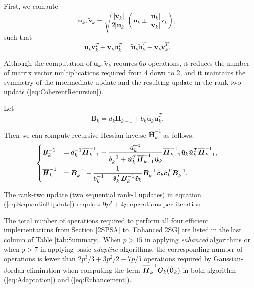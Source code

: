 \documentclass[conference]{IEEEtran} \ifCLASSINFOpdf
\newcommand{\oH}{\bm{\overline{H}}}
\newcommand{\ooH}{\bm{\overline{\overline{H}}}}
\newcommand{\htheta}{\bm{\hat{\uptheta}}}
\begin{document}
First, we compute
\begin{equation} \bm{\tilde{u}}_k, \bm{\tilde{v}}_k =
  \sqrt{\frac{|\bm{v}_k|}{2|\bm{u}_k|}} (\bm{u}_k \pm
  \frac{|\bm{u}_k|}{|\bm{v}_k|}\bm{v}_k),
\end{equation} such that
\begin{equation*} \bm{u}_k \bm{v}_k^{T}+\bm{v}_k \bm{u}_k^{T}
  = \bm{\tilde{u}}_k \bm{\tilde{u}}_k^{T} - \bm{\tilde{v}}_k
  \bm{\tilde{v}}_k^{T}.
\end{equation*}

Although the computation of $\bm{\tilde{u}}_k,
\bm{\tilde{v}}_k$ requires $6p$ operations, it reduces the number of
matrix vector multiplications required from 4 down to 2, and it
maintains the symmetry of the intermediate update and the resulting
update in the rank-two update (\ref{eq:CoherentRecursion}).

Let
\begin{equation*} \bm{B}_k=d_k\oH_{k-1}+b_k\bm{\tilde{u}}_k
  \bm{\tilde{u}}_k^{T}.
\end{equation*}

Then we can compute recursive Hessian inverse $\oH_k^{-1}$ as
follows:
\begin{equation} \label{eq:SequentialUpdate}
  \begin{dcases} \bm{B}_k^{-1} &= d_k^{-1}\oH_{k-1}^{-1}
    -
    \frac{d_k^{-2}}{b_k^{-1}+\bm{\tilde{u}}_k^{T}\oH_{k-1}^{-1}\bm{\tilde{u}}_k}
    \oH_{k-1}^{-1}\bm{\tilde{u}}_k \bm{\tilde{u}}_k^{T}\oH_{k-1}^{-1},\\
    \oH_k^{-1} &=\bm{B}_k^{-1} +
    \frac{1}{b_k^{-1}-\bm{\tilde{v}}_k^{T}\bm{B}_k^{-1}\bm{\tilde{v}}_k}
    \bm{B}_k^{-1}\bm{\tilde{v}}_k \bm{\tilde{v}}_k^{T}\bm{B}_{k}^{-1}.
  \end{dcases}
\end{equation}

The rank-two update (two sequential rank-1 updates) in
equation (\ref{eq:SequentialUpdate}) requires $9p^2 + 4p$ operations
per iteration.

The total number of operations required to perform all four
efficient implementations from Section \ref{2SPSA} to \ref{Enhanced
  2SG} are listed in the last column of Table \ref{tab:Summary}. When
$p>15$ in applying \textit{enhanced} algorithms or when $p>7$ in
applying basic \textit{adaptive} algorithms, the corresponding number
of operations is fewer than $2p^3/3+3p^2/2-7p/6$ operations required
by Gaussian-Jordan elimination when computing the term $\ooH_k^{-1}
\bG_k(\htheta_k)$ in both algorithm (\ref{eq:Adaptation}) and
(\ref{eq:Enhancement}).
\end{document}
